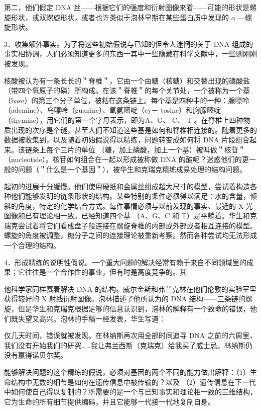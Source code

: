 第二，他们假定 DNA 丝——根据它们的强度和衍射图像来看——可能的形状是螺旋形状，或双螺旋形状，或者也许类似于泡林早期在某些蛋白质中发现的 $\alpha$ —螺旋形状。

3．收集额外事实。为了将这些初始假说与已知的但令人迷惘的关于 DNA 组成的事实相协调，人们必须知道更多的东西一其中一些隐藏在科学文献中，一些则刚刚被发现。

核酸被认为有一条长长的＂脊椎＂，它由一个由糖（核糖）和交替出现的磷酸盐（带四个氧原子的磷）所构成。在该＂脊椎＂的每个关节处，一个被称为一个基（base）的第三个分子单位，被粘在这条链上。每个基是四种中的一种：腺嘌呤（ademine）、鸟嘌呤（guanine）、氧氨嘧啶（cy－ tosine）和胸腺嘧啶（thymine），用它们的第一个字母表示，即为A、G、 C、 T 。在脊椎上四种物质出现的次序是个谜，甚至人们不知道这些基是如何和脊椎相连接的。随着更多的数据被收集到，以及随着初始假说得以精练，问题转变成如何将 DNA 片段组合起来。该链条上每个三片的单位 （糖，加上磷酸，加上一个基）被叫做＂核苷＂（nucleotide）。核苷如何组合在一起以形成被称做 DNA 的酸呢？迷惑他们的更一般的问题（＂什么是一个基因＂），被华生和克瑞克精练成易处理的结构问题。

起初的进展十分缓慢。他们使用硬纸和金属丝组成超大尺寸的模型，尝试着构造各种他们能够发明的链条形状的结构。某些特别的条件必须得以满足：水的含量，倾斜的角度，特定的化学结合方式。每件事情必须与以前发现的事实、最近的 X 光图像和已有理论相一致。已经知道四个基 （A、G、C 和 T）是平躺着。华生和克瑞克尝试着将它们看成盘子般连接在螺旋脊椎的内部或外部或者相互连接的模型。螺旋的角度被调整，糖分子之间的连接理论被重新考察。然而各种尝试均无法形成一个合理的结构。

4．形成精练的说明性假说。一个重大问题的解决经常有赖于来自不同领域里的成果；它往往是一个合作性的事业，但有时是高度竞争的。其

他科学家同样赛着解决 DNA 的结构。威尔金斯和弗兰克林在他们伦敦的实验室里获得较好的 X 射线衍射图像。泡林描述了他所认为的 DNA 结构——三条链的螺旋，但是华生和克瑞克根据足够的信息认识到，泡林的解释有一个致命的错误，他们既失望又高兴。泡林的手稿一经发表，华生写道：

\begin{displayquote}
仅几天时间，错误就被发现。在林纳斯再次用全部时间追寻 DNA 之前的六周里，我们没有开始我们的研究……我让弗兰西斯（克瑞克）给我买了威士忌。林纳斯仍没有赢得诺贝尔奖。\cite{watson1968d}
\end{displayquote}

能够解决问题的这个精练的假说，必须对基因的两个不同的能力做出解释：（1）生命结构中无数的细节是如何在遗传信息中被传输的？以及 （2）遗传信息在下一代中如何使自己得以复制的？所需要的是一个与已知事实和理论相一致的三维结构，它为生命的所有细节提供编码，并且它能够一代接一代地复制自身。

